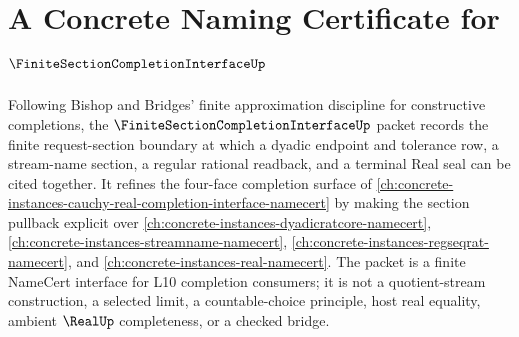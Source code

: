 \chapter{A Concrete Naming Certificate for $\FiniteSectionCompletionInterfaceUp$}
\label{ch:concrete-instances-finite-section-completion-interface-namecert}

Following Bishop and Bridges' finite approximation discipline for constructive completions, the $\FiniteSectionCompletionInterfaceUp$ packet records the finite request-section boundary at which a dyadic endpoint and tolerance row, a stream-name section, a regular rational readback, and a terminal Real seal can be cited together. It refines the four-face completion surface of \autoref{ch:concrete-instances-cauchy-real-completion-interface-namecert} by making the section pullback explicit over \autoref{ch:concrete-instances-dyadicratcore-namecert}, \autoref{ch:concrete-instances-streamname-namecert}, \autoref{ch:concrete-instances-regseqrat-namecert}, and \autoref{ch:concrete-instances-real-namecert}. The packet is a finite NameCert interface for L10 completion consumers; it is not a quotient-stream construction, a selected limit, a countable-choice principle, host real equality, ambient $\RealUp$ completeness, or a checked bridge.

